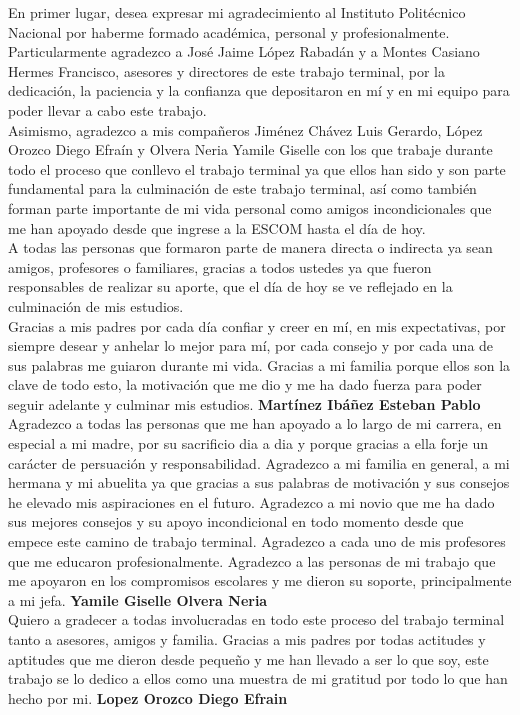 \documentclass[12pt]{report}
\begin{document}
En primer lugar, desea expresar mi agradecimiento al Instituto Politécnico Nacional por haberme formado académica, personal y profesionalmente. Particularmente agradezco a José Jaime López Rabadán y a Montes Casiano Hermes Francisco, asesores y directores de este trabajo terminal, por la dedicación, la paciencia y la confianza que depositaron en mí y en mi equipo para poder llevar a cabo este trabajo.\\ 
Asimismo, agradezco a mis compañeros Jiménez Chávez Luis Gerardo, López Orozco Diego Efraín y Olvera Neria Yamile Giselle con los que trabaje durante todo el proceso que conllevo el trabajo terminal ya que ellos han sido y son parte fundamental para la culminación de este trabajo terminal, así como también forman parte importante de mi vida personal como amigos incondicionales que me han apoyado desde que ingrese a la ESCOM hasta el día de hoy.\\
A todas las personas que formaron parte de manera directa o indirecta ya sean amigos, profesores o familiares, gracias a todos ustedes ya que fueron responsables de realizar su aporte, que el día de hoy se ve reflejado en la culminación de mis estudios.\\
Gracias a mis padres por cada día confiar y creer en mí, en mis expectativas, por siempre desear y anhelar lo mejor para mí, por cada consejo y por cada una de sus palabras me guiaron durante mi vida. Gracias a mi familia porque ellos son la clave de todo esto, la motivación que me dio y me ha dado fuerza para poder seguir adelante y culminar mis estudios. \textbf{Martínez Ibáñez Esteban Pablo}\\

Agradezco a todas las personas que me han apoyado a lo largo de mi carrera, en especial a mi madre, por su sacrificio dia a dia y porque gracias a ella forje un carácter de persuación y responsabilidad. Agradezco a mi familia en general, a mi hermana y mi abuelita  ya que gracias a sus palabras de motivación y sus consejos he elevado mis aspiraciones en el futuro. Agradezco a mi novio que me ha dado sus mejores consejos y su apoyo incondicional en todo momento desde que empece este camino de trabajo terminal. Agradezco a cada uno de mis profesores que me educaron profesionalmente. Agradezco a las personas de mi trabajo que me apoyaron en los compromisos escolares y me dieron su soporte, principalmente a mi jefa.	\textbf{Yamile Giselle Olvera Neria}\\

Quiero a gradecer a todas involucradas en todo este proceso del trabajo terminal tanto a asesores, amigos y familia. Gracias a mis padres por todas actitudes y aptitudes que me dieron desde pequeño y me han llevado a ser lo que soy, este trabajo se lo dedico a ellos como una muestra de mi gratitud por todo lo que han hecho por mi. \textbf{Lopez Orozco Diego Efrain}
\newpage
\end{document}
